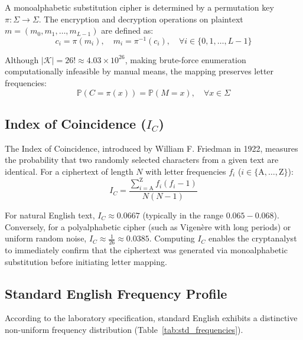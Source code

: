 \documentclass[12pt,a4paper]{article}
\begin{document}
A monoalphabetic substitution cipher is determined by a permutation key $\pi: \Sigma \to \Sigma$. The encryption and decryption operations on plaintext $m = (m_0, m_1, \dots, m_{L-1})$ are defined as:
\begin{equation}
    c_i = \pi(m_i), \quad m_i = \pi^{-1}(c_i), \quad \forall i \in \{0, 1, \dots, L-1\}
\end{equation}

Although $|\mathcal{K}| = 26! \approx 4.03 \times 10^{26}$, making brute-force enumeration computationally infeasible by manual means, the mapping preserves letter frequencies:
\begin{equation}
    \mathbb{P}(C = \pi(x)) = \mathbb{P}(M = x), \quad \forall x \in \Sigma
\end{equation}

\subsection{Index of Coincidence ($I_C$)}
The Index of Coincidence, introduced by William F. Friedman in 1922, measures the probability that two randomly selected characters from a given text are identical. For a ciphertext of length $N$ with letter frequencies $f_i$ ($i \in \{\text{A}, \dots, \text{Z}\}$):
\begin{equation}
    \label{eq:ioc}
    I_C = \frac{\sum_{i=\text{A}}^{\text{Z}} f_i (f_i - 1)}{N(N - 1)}
\end{equation}

For natural English text, $I_C \approx 0.0667$ (typically in the range $0.065 - 0.068$). Conversely, for a polyalphabetic cipher (such as Vigenère with long periods) or uniform random noise, $I_C \approx \frac{1}{26} \approx 0.0385$. Computing $I_C$ enables the cryptanalyst to immediately confirm that the ciphertext was generated via monoalphabetic substitution before initiating letter mapping.

\subsection{Standard English Frequency Profile}
According to the laboratory specification, standard English exhibits a distinctive non-uniform frequency distribution (Table~\ref{tab:std_frequencies}).
\end{document}
